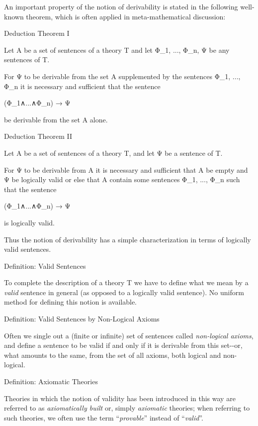 An important property of the notion of derivability is stated in the
following well-known theorem, which is often applied in
meta-mathematical discussion:

\protect\hypertarget{anchor-20}{}{}Deduction Theorem I

Let A be a set of sentences of a theory T and let Φ\_1, ..., Φ\_n, Ψ be
any sentences of T.

For Ψ to be derivable from the set A supplemented by the sentences Φ\_1,
..., Φ\_n it is necessary and sufficient that the sentence

(Φ\_1∧...∧Φ\_n) → Ψ

be derivable from the set A alone.

\protect\hypertarget{anchor-21}{}{}Deduction Theorem II

Let A be a set of sentences of a theory T, and let Ψ be a sentence of T.

For Ψ to be derivable from A it is necessary and sufficient that A be
empty and Ψ be logically valid or else that A contain some sentences
Φ\_1, ..., Φ\_n such that the sentence

(Φ\_1∧...∧Φ\_n) → Ψ

is logically valid.

Thus the notion of derivability has a simple characterization in terms
of logically valid sentences.

\protect\hypertarget{anchor-22}{}{}Definition: Valid Sentences

To complete the description of a theory T we have to define what we mean
by a \emph{valid} sentence in general (as opposed to a logically valid
sentence). No uniform method for defining this notion is available.

\protect\hypertarget{anchor-23}{}{}Definition: Valid Sentences by
Non-Logical Axioms

Often we single out a (finite or infinite) set of sentences called
\emph{non-logical axioms}, and define a sentence to be valid if and only
if it is derivable from this set-\/-or, what amounts to the same, from
the set of all axioms, both logical and non-logical.

\protect\hypertarget{anchor-24}{}{}

\protect\hypertarget{anchor-25}{}{}Definition: Axiomatic Theories

Theories in which the notion of validity has been introduced in this way
are referred to as \emph{axiomatically built} or, simply
\emph{axiomatic} theories; when referring to such theories, we often use
the term ``\emph{provable}'' instead of ``\emph{valid}''.

